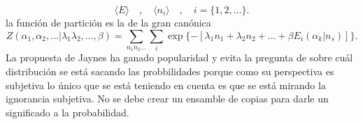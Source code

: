 \begin{equation}
\langle E \rangle \quad , \quad \langle n_{i} \rangle \quad , \quad i=  \{ 1,2,... \}.
\end{equation} 
la función de partición es la de la gran canónica 
\begin{equation}
Z(\alpha_{1},\alpha_{2},...|\lambda_{1} \lambda_{2} ,...,\beta )= \sum_{n_{1} n_{2}...} \sum_{i} \exp \{ -[ \lambda_{1} n_{1}+\lambda_{2} n_{2}+...+\beta E_{i} (\alpha_{k} | n_{s} ) ] \}.
\end{equation}
La propuesta de Jaynes ha ganado popularidad y evita la pregunta de sobre cuál distribución se está sacando las probbilidades porque como su perspectiva es subjetiva lo único que se está teniendo en cuenta es que se está mirando la ignorancia subjetiva. No se debe crear un ensamble de copias para darle un significado a la probabilidad.

